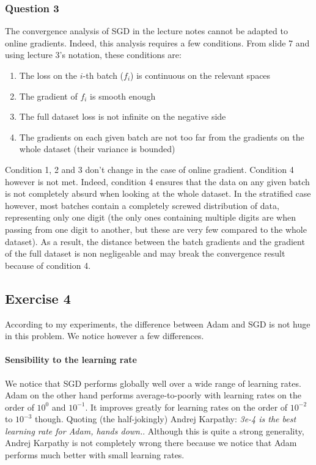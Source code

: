 \documentclass[12pt]{article}
\begin{document}
\subsubsection{Question 3}
The convergence analysis of SGD in the lecture notes cannot be adapted to online gradients. Indeed, this analysis requires a few conditions. From slide 7 and using lecture 3's notation, these conditions are:
\begin{enumerate}
  \item The loss on the $i$-th batch ($f_i$) is continuous on the relevant spaces
  \item The gradient of $f_i$ is smooth enough
  \item The full dataset loss is not infinite on the negative side
  \item The gradients on each given batch are not too far from the gradients on the whole dataset (their variance is bounded)
\end{enumerate}
Condition 1, 2 and 3 don't change in the case of online gradient. Condition 4 however is not met. Indeed, condition 4 ensures that the data on any given batch is not completely absurd when looking at the whole dataset. In the stratified case however, most batches contain a completely screwed distribution of data, representing only one digit (the only ones containing multiple digits are when passing from one digit to another, but these are very few compared to the whole dataset). As a result, the distance between the batch gradients and the gradient of the full dataset is non negligeable and may break the convergence result because of condition 4.

\subsection{Exercise 4}
According to my experiments, the difference between Adam and SGD is not huge in this problem. We notice however a few differences.
\paragraph{Sensibility to the learning rate}
We notice that SGD performs globally well over a wide range of learning rates. Adam on the other hand performs average-to-poorly with learning rates on the order of $10^{0}$ and $10^{-1}$. It improves greatly for learning rates on the order of $10^{-2}$ to $10^{-3}$ though. Quoting (the half-jokingly) Andrej Karpathy: \textit{3e-4 is the best learning rate for Adam, hands down.}. Although this is quite a strong generality, Andrej Karpathy is not completely wrong there because we notice that Adam performs much better with small learning rates.
\end{document}
